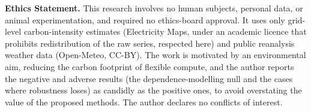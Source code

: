 \documentclass[12pt]{article}
\begin{document}
\begin{titlepage}
\vspace{0.6cm}
\begin{minipage}{0.9\textwidth}\small
\textbf{Ethics Statement.} This research involves no human subjects, personal data, or
animal experimentation, and required no ethics-board approval. It uses only
grid-level carbon-intensity estimates (Electricity Maps, under an academic licence that
prohibits redistribution of the raw series, respected here) and public reanalysis
weather data (Open-Meteo, CC-BY). The work is motivated by an environmental aim,
reducing the carbon footprint of flexible compute, and the author reports the negative
and adverse results (the dependence-modelling null and the cases where robustness loses)
as candidly as the positive ones, to avoid overstating the value of the proposed
methods. The author declares no conflicts of interest.
\end{minipage}
\end{titlepage}
\pagestyle{plain}%

\end{document}

